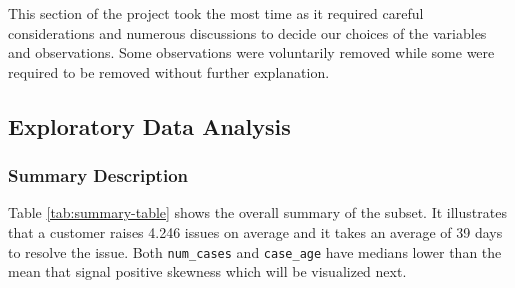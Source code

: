\documentclass[
]{article}
\begin{document}
This section of the project took the most time as it required careful considerations and numerous discussions to decide our choices of the variables and observations. Some observations were voluntarily removed while some were required to be removed without further explanation.

\subsection{Exploratory Data Analysis}\label{exploratory-data-analysis}

\subsubsection{Summary Description}\label{summary-description}

\begin{table}[!h]
\centering
\caption{\label{tab:summary-table}Custom Summary for Selected Variables}
\centering
{}
\end{table}

Table \ref{tab:summary-table} shows the overall summary of the subset. It illustrates that a customer raises 4.246 issues on average and it takes an average of 39 days to resolve the issue. Both \texttt{num\_cases} and \texttt{case\_age} have medians lower than the mean that signal positive skewness which will be visualized next.
\end{document}
